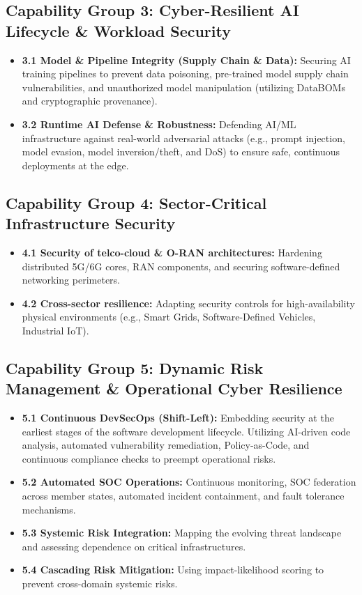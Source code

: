 \documentclass[11pt,a4paper]{article}
\begin{document}
\subsection*{Capability Group 3: Cyber-Resilient AI Lifecycle \& Workload Security}
\begin{itemize}
    \item \textbf{3.1 Model \& Pipeline Integrity (Supply Chain \& Data):} Securing AI training pipelines to prevent data poisoning, pre-trained model supply chain vulnerabilities, and unauthorized model manipulation (utilizing DataBOMs and cryptographic provenance).
    \item \textbf{3.2 Runtime AI Defense \& Robustness:} Defending AI/ML infrastructure against real-world adversarial attacks (e.g., prompt injection, model evasion, model inversion/theft, and DoS) to ensure safe, continuous deployments at the edge.
\end{itemize}

\subsection*{Capability Group 4: Sector-Critical Infrastructure Security}
\begin{itemize}
    \item \textbf{4.1 Security of telco-cloud \& O-RAN architectures:} Hardening distributed 5G/6G cores, RAN components, and securing software-defined networking perimeters.
    \item \textbf{4.2 Cross-sector resilience:} Adapting security controls for high-availability physical environments (e.g., Smart Grids, Software-Defined Vehicles, Industrial IoT).
\end{itemize}

\subsection*{Capability Group 5: Dynamic Risk Management \& Operational Cyber Resilience}
\begin{itemize}
    \item \textbf{5.1 Continuous DevSecOps (Shift-Left):} Embedding security at the earliest stages of the software development lifecycle. Utilizing AI-driven code analysis, automated vulnerability remediation, Policy-as-Code, and continuous compliance checks to preempt operational risks.
    \item \textbf{5.2 Automated SOC Operations:} Continuous monitoring, SOC federation across member states, automated incident containment, and fault tolerance mechanisms.
    \item \textbf{5.3 Systemic Risk Integration:} Mapping the evolving threat landscape and assessing dependence on critical infrastructures.
    \item \textbf{5.4 Cascading Risk Mitigation:} Using impact-likelihood scoring to prevent cross-domain systemic risks.
\end{itemize}
\end{document}
